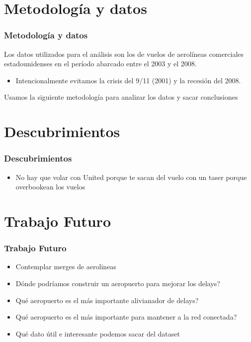 \documentclass{beamer}
\begin{document}
\section{Metodología y datos}
\begin{frame}
\frametitle{Metodología y datos}
Los datos utilizados para el análisis son los de vuelos de aerolíneas comerciales estadounidenses en el período abarcado entre el 2003 y el 2008.
\begin{itemize}
\item Intencionalmente evitamos la crisis del 9/11 (2001) y la recesión del 2008.
\end{itemize}
Usamos la siguiente metodología para analizar los datos y sacar conclusiones
\end{frame}

\section{Descubrimientos}
\begin	{frame}
\frametitle{Descubrimientos}
\begin{itemize}
\item No hay que volar con United porque te sacan del vuelo con un taser porque overbookean los vuelos
\end{itemize}

\end{frame}

\section{Trabajo Futuro}
\begin{frame}
\frametitle{Trabajo Futuro}
\begin{itemize}
\item Contemplar merges de aerolineas
\item Dónde podríamos construir un aeropuerto para mejorar los delays?
\item Qué aeropuerto es el más importante alivianador de delays?
\item Qué aeropuerto es el más importante para mantener a la red conectada?
\item Qué dato útil e interesante podemos sacar del dataset
\end{itemize}
\end{frame}
\end{document}

